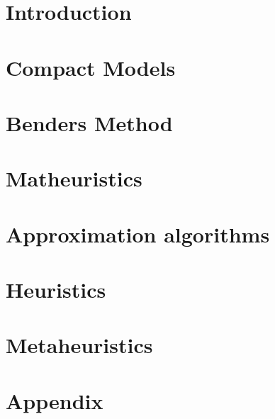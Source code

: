 \documentclass{lincolncsthesis}
\begin{document}

\maketitle

\thesisTables
\thesisBodyStart



\chapter{Introduction}


\chapter{Compact Models}


\chapter{Benders Method}


\chapter{Matheuristics}
\label{chap:Matheuristics}


\chapter{Approximation algorithms}


\chapter{Heuristics}
\label{chap:Heuristics}


\chapter{Metaheuristics}
\label{chap:metaheuristics}


% 
\appendix
\setcounter{secnumdepth}{-1}
\chapter{Appendix}


\printReferences
\end{document}
